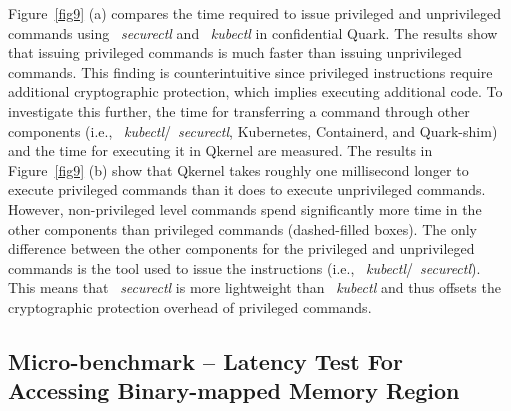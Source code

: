 Figure~\ref{fig9} (a) compares the time required to issue privileged and unprivileged commands using ~\emph{securectl} and ~\emph{kubectl} in confidential Quark. The results show that issuing privileged commands is much faster than issuing unprivileged commands. 
This finding is counterintuitive since privileged instructions require additional cryptographic protection, which implies executing additional code. To investigate this further, the time for transferring a command through other components (i.e., ~\emph{kubectl}/~\emph{securectl},  Kubernetes, Containerd, and Quark-shim) and the time for executing it in Qkernel 
are measured.  The results in Figure~\ref{fig9} (b) show that Qkernel takes roughly one millisecond longer to execute privileged commands than it does to execute unprivileged commands. However, non-privileged level commands spend significantly more 
time in the other components than privileged commands (dashed-filled boxes). The only difference between the other components for the privileged and unprivileged commands is the tool used to issue the instructions (i.e., ~\emph{kubectl}/~\emph{securectl}). This means that ~\emph{securectl} is more lightweight than 
~\emph{kubectl} and thus offsets the cryptographic protection overhead of privileged commands.






\subsection{Micro-benchmark – Latency Test For Accessing Binary-mapped Memory Region}
\label{accesiing_binary_mapped_memory}


    
     
     
